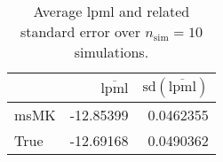 \begin{table}[H]

\caption{Average lpml and related standard error over $n_{\text{sim}} = 10$ simulations.}
\centering
\begin{tabular}[t]{lrr}
\toprule
  & $\overbar{\text{lpml}}$ & $\text{sd}(\overbar{\text{lpml}})$\\
\midrule
msMK & -12.85399 & 0.0462355\\
True & -12.69168 & 0.0490362\\
\bottomrule
\end{tabular}
\end{table}